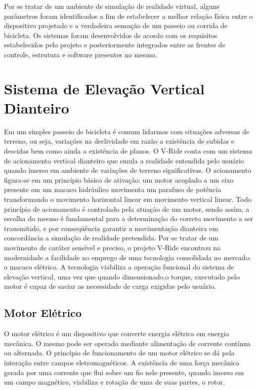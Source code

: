 Por se tratar de um ambiente de simulação de realidade virtual, alguns parâmetros foram identificados a fim de estabelecer a melhor relação física entre o dispositivo projetado e a verdadeira sensação de um passeio ou corrida de bicicleta. Os sistemas foram desenvolvidos de acordo com os requisitos estabelecidos pelo projeto e posteriormente integrados entre as frentes de controle, estrutura e software presentes no mesmo.

\section{Sistema de Elevação Vertical Dianteiro}

Em um simples passeio de bicicleta é comum lidarmos com situações adversas de terreno, ou seja, variações na declividade em razão a existência de subidas e descidas bem como ainda a existência de planos. O V-Ride conta com um sistema de acionamento vertical dianteiro que emula a realidade entendida pelo usuário quando imerso em ambiente de variações de terreno significativas. 
O acionamento figura-se em um princípio básico de ativação: um motor acoplado a um eixo presente em um macaco hidráulico movimenta um parafuso de potência transformando o movimento horizontal linear em movimento vertical linear. Todo princípio de acionamento é controlado pela atuação de um motor, sendo assim, a escolha do mesmo é fundamental para a determinação do correto movimento a ser transmitido, e por conseqüência garantir a movimentação dianteira em concordância a simulação de realidade pretendida. 
Por se tratar de um movimento de caráter sensível e preciso, o projeto V-Ride encontrou na modernidade a facilidade no emprego de uma tecnologia consolidada no mercado: o macaco elétrico. A tecnologia viabiliza a operação funcional do sistema de elevação vertical, uma vez que quando  dimensionado,o torque, executado pelo motor é capaz de saciar as necessidade de carga exigidas pelo usuário.

\subsection{Motor Elétrico}

O motor elétrico é um dispositivo que converte energia elétrica em energia mecânica. O mesmo pode ser operado mediante alimentação de corrente contínua ou alternada. O princípio de funcionamento de um motor elétrico se dá pela interação entre campos eletromagnéticos. A existência de uma força mecânica gerada por uma corrente que flui sobre um fio nele presente, quando imerso em um campo magnético, viabiliza e rotação de uma de suas partes, o rotor. 
                 
